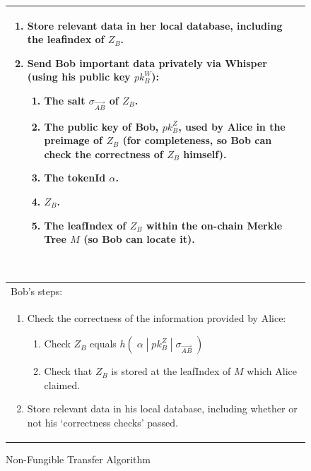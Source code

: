 \documentclass{article}
\newcounter{ongoingEnumCounter}%
\begin{document}
\begin{figure}[H]
\begin{center}
\begin{framed}
\begin{tabular}{p{16cm}}
\begin{enumerate}
          \setcounter{enumi}{\value{ongoingEnumCounter}}
          \item Store relevant data in her local database, including the leafindex of $Z_B$.
          \item Send Bob important data privately via Whisper (using his public key $pk^W_B$):
          \begin{enumerate}
            \item The salt $\sigma_{\vec{AB}}$ of $Z_B$.
            \item The public key of Bob, $pk^Z_B$, used by Alice in the preimage of $Z_B$ (for completeness, so Bob can check the correctness of $Z_B$ himself).
            \item The tokenId $\alpha$.
            \item $Z_B$.
            \item The leafIndex of $Z_B$ within the on-chain Merkle Tree $M$ (so Bob can locate it).
          \end{enumerate}
          \setcounter{ongoingEnumCounter}{\value{enumi}}
        \end{enumerate}
        \ \\
        \hline
        Bob's steps:\\
        \begin{enumerate}
          \setcounter{enumi}{\value{ongoingEnumCounter}}
          \item Check the correctness of the information provided by Alice:
          \begin{enumerate}
            \item Check $Z_B$ equals $h(\;\alpha\;|\;pk^Z_B\;|\;\sigma_{\vec{AB}}\;)$
            \item Check that $Z_B$ is stored at the leafIndex of $M$ which Alice claimed.
          \end{enumerate}
          \item Store relevant data in his local database, including whether or not his `correctness checks' passed.
          \setcounter{ongoingEnumCounter}{0} %
        \end{enumerate}
			\end{tabular}
		\end{framed}
	\end{center}
\caption{Non-Fungible Transfer Algorithm} %
\end{figure}
\end{document}
